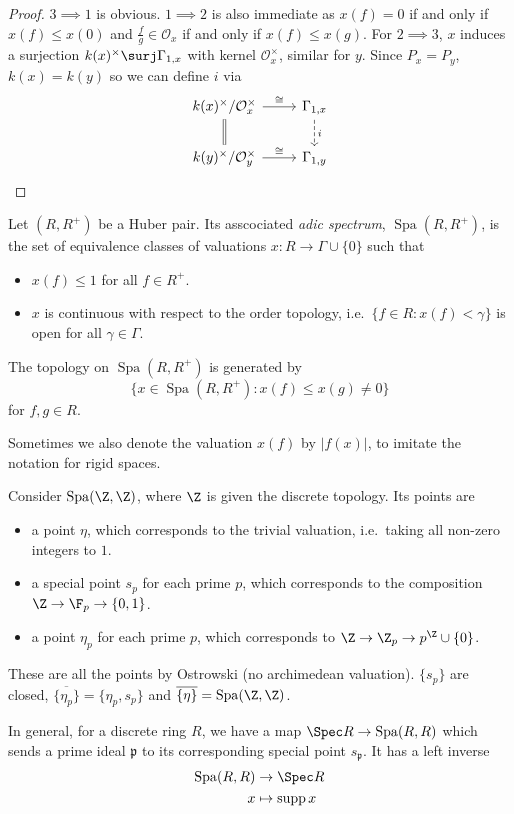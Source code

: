 \documentclass[a4paper]{article}
\renewcommand*{\O}{\mathcal{O}}
\DeclareMathOperator{\Spa}{Spa}
\DeclareMathOperator{\supp}{supp} %
\begin{document}
\begin{proof}
  \(3 \implies 1\) is obvious. \(1 \implies 2\) is also immediate as \(x(f) = 0\) if and only if \(x(f) \leq x(0)\) and \(\frac{f}{g} \in \O_x\) if and only if \(x(f) \leq x(g)\). For \(2 \implies 3\), \(x\) induces a surjection \(k(x)^\times \surj \Gamma_{1, x}\) with kernel \(\O_x^\times\), similar for \(y\). Since \(P_x = P_y\), \(k(x) = k(y)\) so we can define \(i\) via
  \[
    \begin{tikzcd}
      k(x)^\times/\O_x^\times \ar[r, "\cong"] \ar[d, equal] & \Gamma_{1, x} \ar[d, dashed, "i"] \\
      k(y)^\times/\O_y^\times \ar[r, "\cong"] & \Gamma_{1, y}
    \end{tikzcd}
  \]
\end{proof}

\begin{definition}
  Let \((R, R^+)\) be a Huber pair. Its asscociated \emph{adic spectrum}, \(\Spa(R, R^+)\), is the set of equivalence classes of valuations \(x: R \to \Gamma \cup \{0\}\) such that
  \begin{itemize}
  \item \(x(f) \leq 1\) for all \(f \in R^+\).
  \item \(x\) is continuous with respect to the order topology, i.e.\ \(\{f\in R: x(f) < \gamma\}\) is open for all \(\gamma \in \Gamma\).
  \end{itemize}

  The topology on \(\Spa(R, R^+)\) is generated by
  \[
    \{x \in \Spa(R, R^+): x(f) \leq x(g) \ne 0\}
  \]
  for \(f, g \in R\).
\end{definition}

Sometimes we also denote the valuation \(x(f)\) by \(|f(x)|\), to imitate the notation for rigid spaces.

\begin{eg}
  Consider \(\Spa(\Z, \Z)\), where \(\Z\) is given the discrete topology. Its points are
  \begin{itemize}
  \item a point \(\eta\), which corresponds to the trivial valuation, i.e.\ taking all non-zero integers to \(1\).
  \item a special point \(s_p\) for each prime \(p\), which corresponds to the composition \(\Z \to \F_p \to \{0, 1\}\).
  \item a point \(\eta_p\) for each prime \(p\), which corresponds to \(\Z \to \Z_p \to p^\Z \cup \{0\}\).
  \end{itemize}
  These are all the points by Ostrowski (no archimedean valuation). \(\{s_p\}\) are closed, \(\overline{\{\eta_p\}} = \{\eta_p, s_p\}\) and \(\overline{\{\eta\}} = \Spa(\Z, \Z)\).

  In general, for a discrete ring \(R\), we have a map \(\Spec R \to \Spa(R, R)\) which sends a prime ideal \(\mathfrak p\) to its corresponding special point \(s_{\mathfrak p}\). It has a left inverse
  \begin{align*}
    \Spa(R, R) &\to \Spec R \\
    x &\mapsto \supp x
  \end{align*}
\end{eg}
\end{document}
